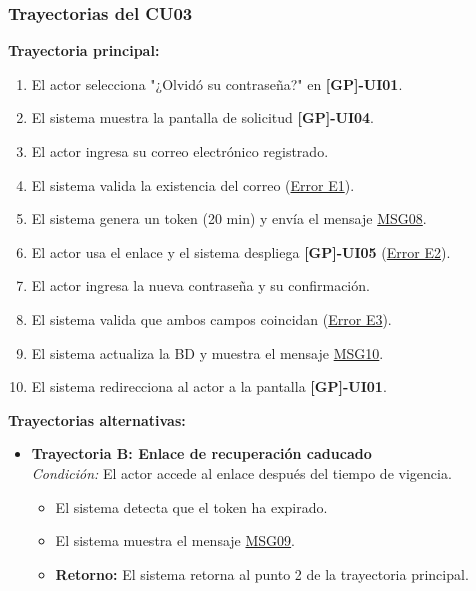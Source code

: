 \begin{appendices}
\subsubsection{Trayectorias del CU03}
\textbf{Trayectoria principal:}
\begin{enumerate}[nosep]
    \item El actor selecciona "¿Olvidó su contraseña?" en \textbf{[GP]-UI01}.
    \item El sistema muestra la pantalla de solicitud \textbf{[GP]-UI04}.
    \item El actor ingresa su correo electrónico registrado.
    \item El sistema valida la existencia del correo (\hyperlink{msg:MSG03}{Error E1}).
    \item El sistema genera un token (20 min) y envía el mensaje \hyperlink{msg:MSG08}{MSG08}.
    \item El actor usa el enlace y el sistema despliega \textbf{[GP]-UI05} (\hyperlink{err:E6}{Error E2}).
    \item El actor ingresa la nueva contraseña y su confirmación.
    \item El sistema valida que ambos campos coincidan (\hyperlink{err:E3}{Error E3}).
    \item El sistema actualiza la BD y muestra el mensaje \hyperlink{msg:MSG10}{MSG10}.
    \item El sistema redirecciona al actor a la pantalla \textbf{[GP]-UI01}.
\end{enumerate}

\textbf{Trayectorias alternativas:}
\begin{itemize}[leftmargin=*]
    \item \textbf{Trayectoria B: Enlace de recuperación caducado} \\
    \textit{Condición:} El actor accede al enlace después del tiempo de vigencia.
    \begin{itemize}[nosep]
        \item[B-1:] El sistema detecta que el token ha expirado.
        \item[B-2:] El sistema muestra el mensaje \hyperlink{msg:MSG09}{MSG09}.
        \item \textbf{Retorno:} El sistema retorna al punto 2 de la trayectoria principal.
    \end{itemize}
\end{itemize}

\newpage


\end{appendices}
